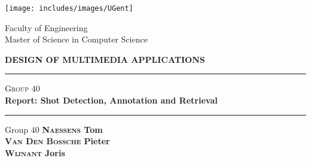 \begin{titlepage}

\fontsize{12pt}{14pt}
\selectfont

\begin{center}

\texttt{[image: includes/images/UGent]}

\vspace{0.5cm}

Faculty of Engineering\\
Master of Science in Computer Science\\

\vspace{4.0cm}

\fontsize{17.28pt}{21pt}
\selectfont

\textbf{DESIGN OF MULTIMEDIA APPLICATIONS} \\
\vspace{40pt}

\hrule
\vspace{20pt}
\textsc{Group 40}\\
\vspace{10pt}
\textbf{Report: Shot Detection, Annotation and Retrieval}\\
\vspace{20pt}
\hrule

\vspace{25pt}

\fontsize{12pt}{14pt}
\selectfont

\vspace{5.0cm}

\fontsize{12pt}{14pt}
\selectfont

\hspace{0.5cm} Group 40
\textbf{ 
	\hfill\textsc{Naessens} Tom\\
	\hfill\textsc{Van Den Bossche} Pieter\\
	\hfill\textsc{Wijnant} Joris\\
}
\end{center}
\end{titlepage}